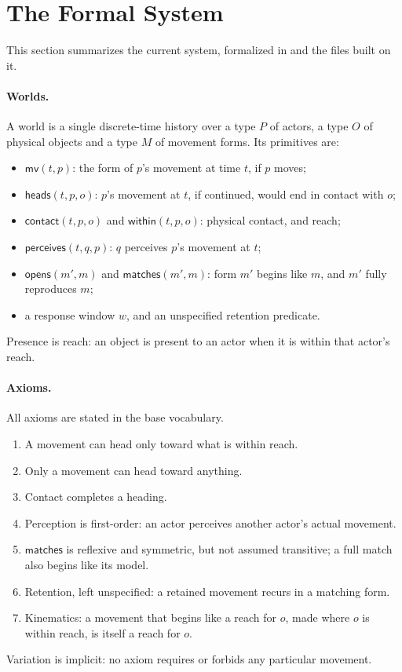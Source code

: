 \documentclass[11pt]{article}
\begin{document}
\section{The Formal System}

This section summarizes the current system, formalized in
 and the files built on it.

\paragraph{Worlds.}
A world is a single discrete-time history over a type $P$ of actors, a type $O$ of
physical objects and a type $M$ of movement forms. Its primitives are:
\begin{itemize}[nosep]
  \item $\mathsf{mv}(t,p)$: the form of $p$'s movement at time $t$, if $p$ moves;
  \item $\mathsf{heads}(t,p,o)$: $p$'s movement at $t$, if continued, would end in contact
    with $o$;
  \item $\mathsf{contact}(t,p,o)$ and $\mathsf{within}(t,p,o)$: physical contact, and reach;
  \item $\mathsf{perceives}(t,q,p)$: $q$ perceives $p$'s movement at $t$;
  \item $\mathsf{opens}(m',m)$ and $\mathsf{matches}(m',m)$: form $m'$ begins like $m$, and
    $m'$ fully reproduces $m$;
  \item a response window $w$, and an unspecified retention predicate.
\end{itemize}
Presence is reach: an object is present to an actor when it is within that actor's
reach.

\paragraph{Axioms.}
All axioms are stated in the base vocabulary.
\begin{enumerate}[label=A\arabic*., nosep]
  \item A movement can head only toward what is within reach.
  \item Only a movement can head toward anything.
  \item Contact completes a heading.
  \item Perception is first-order: an actor perceives another actor's actual movement.
  \item $\mathsf{matches}$ is reflexive and symmetric, but not assumed transitive; a full
    match also begins like its model.
  \item Retention, left unspecified: a retained movement recurs in a matching form.
  \item Kinematics: a movement that begins like a reach for $o$, made where $o$ is within
    reach, is itself a reach for $o$.
\end{enumerate}
Variation is implicit: no axiom requires or forbids any particular movement.
\end{document}
